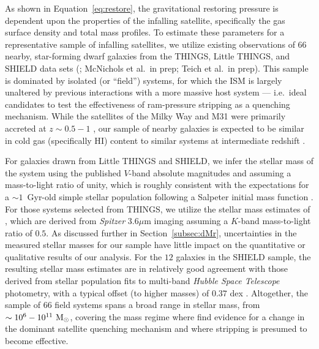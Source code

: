 As shown in Equation~\ref{eq:restore}, the gravitational restoring
pressure is dependent upon the properties of the infalling satellite,
specifically the gas surface density and total mass profiles.
%
To estimate these parameters for a representative sample of infalling
satellites, we utilize existing observations of $66$ nearby,
star-forming dwarf galaxies from the THINGS, Little THINGS, and SHIELD
data sets (\citealt{walter08, hunter12, cannon11}; McNichols et al.~in
prep; Teich et al.~in prep). 
%
This sample is dominated by isolated (or ``field'') systems, for which
the ISM is largely unaltered by previous interactions with a more
massive host system --- i.e.~ideal candidates to test the
effectiveness of ram-pressure stripping as a quenching mechanism.
%
While the satellites of the Milky Way and M31 were primarily accreted
at $z \sim 0.5-1$ \citep{wetzel15a, fham15}, our sample of nearby
galaxies is expected to be similar in cold gas (specifically
H{\scriptsize I}) content to similar systems at intermediate redshift
\citep{popping15, somerville15}.
%

For galaxies drawn from Little THINGS and SHIELD, we infer the stellar
mass of the system using the published $V$-band absolute magnitudes
\citep{hunter12, hauerberg15} and assuming a mass-to-light ratio of
unity, which is roughly consistent with the expectations for a
$\sim1$~Gyr-old simple stellar population following a Salpeter initial
mass function \citep[e.g.][]{maraston98}.
%
For those systems selected from THINGS, we utilize the stellar mass
estimates of \citet{leroy08}, which are derived from {\it Spitzer}
3.6$\mu$m imaging assuming a $K$-band mass-to-light ratio of $0.5$.
%
As discussed further in Section~\ref{subsec:dMr}, uncertainties in the
measured stellar masses for our sample have little impact on the
quantitative or qualitative results of our analysis.
%
For the $12$ galaxies in the SHIELD sample, the resulting stellar mass
estimates are in relatively good agreement with those derived from
stellar population fits to multi-band {\it Hubble Space Telescope}
photometry, with a typical offset (to higher masses) of $0.37$ dex
\citep{mcquinn15}.
%
Altogether, the sample of $66$ field systems spans a broad range in
stellar mass, from $\sim10^{6}-10^{11}~{\rm M}_{\odot}$, covering the mass
regime where \citet{fham15} find evidence for a change in the dominant
satellite quenching mechanism and where stripping is presumed to
become effective.
%

